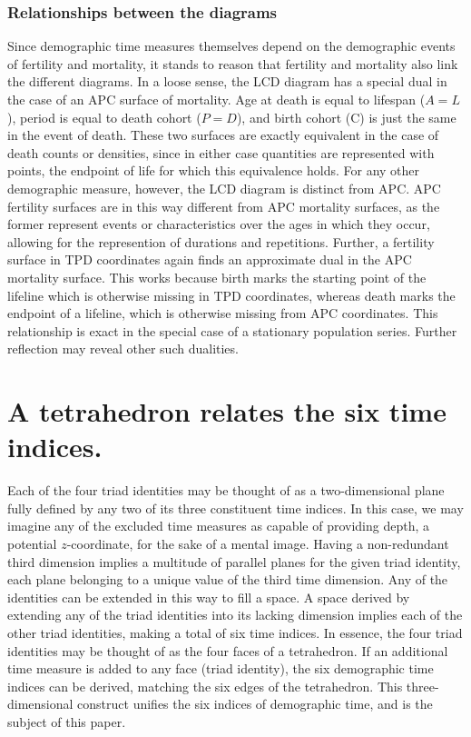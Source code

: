 \documentclass[12pt,oneside,a4paper]{article} %
\begin{document}
\subsubsection{Relationships between the diagrams}
\label{relationshipstriads}
Since demographic time measures themselves depend on the demographic events of
fertility and mortality, it stands to reason that fertility and mortality also
link the different diagrams. In a loose sense, the LCD diagram has a
special dual in the case of an APC surface of mortality. Age at death is equal
to lifespan ($A=L$), period is equal to death cohort ($P=D$), and birth cohort
(C) is just the same in the event of death. These two surfaces are exactly
equivalent in the case of death counts or densities, since in either case
quantities are represented with points, the endpoint of life for which this
equivalence holds. For any other demographic measure, however, the LCD diagram
is distinct from APC. APC fertility surfaces are in this way different from
APC mortality surfaces, as the former represent events or characteristics over
the ages in which they occur, allowing for the represention of
durations and repetitions.
Further, a fertility surface in TPD coordinates
again finds an approximate dual in the APC mortality surface. This works
because birth marks the starting point of the lifeline which is otherwise
missing in TPD coordinates, whereas death marks the endpoint of a lifeline,
which is otherwise missing from APC coordinates. This relationship is exact in
the special case of a stationary population series. Further reflection may
reveal other such dualities.

\FloatBarrier
\section{A tetrahedron relates the six time indices.}
Each of the four triad identities may be thought of as a
two-dimensional plane fully defined by any two of its three constituent time
indices.
In this case, we may imagine any of the excluded time measures as capable of
providing depth, a potential $z$-coordinate, for the sake of a mental image.
Having a non-redundant third dimension implies a multitude of parallel planes
for the given triad identity, each plane belonging to a unique value of the
third time dimension. Any of the identities can be extended in this way to fill a space. A space derived by
extending any of the triad identities into its lacking dimension implies each of
the other triad identities, making a total of six time indices. In essence, the
four triad identities may be thought of as the four faces of a
tetrahedron. If an additional time measure is added to any face (triad
identity), the six demographic time indices can be derived, matching the six edges of the tetrahedron. This three-dimensional construct unifies the six indices of demographic time, and is the subject of this paper.
\end{document}

